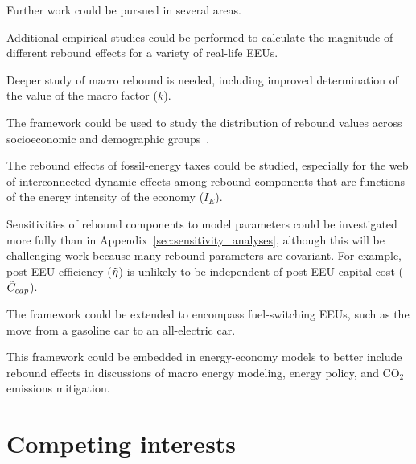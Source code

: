 \documentclass[12pt]{article}\usepackage[]{graphicx}\usepackage[]{xcolor}
\begin{document}
Further work could be pursued in several areas.
%
\begin{enumerate*}[label={(\roman*)}]

  \item Additional empirical studies could be performed
        to calculate the magnitude of different
        rebound effects for a variety of real-life EEUs.

  \item Deeper study of macro rebound is needed,
        including improved determination
        of the value of the macro factor ($k$).

  \item The framework could be used to study the
        distribution of rebound values
        across socioeconomic and demographic groups~\citep{Carroll2017}.

  \item The rebound effects of fossil-energy taxes
        could be studied,
        especially for the web of interconnected dynamic effects
        among rebound components that are functions
        of the energy intensity of the economy ($I_E$).

  \item Sensitivities of rebound components to model parameters
        could be investigated more fully
        than in Appendix~\ref{sec:sensitivity_analyses},
        although this will be challenging work because
        many rebound parameters are covariant.
        For example, post-EEU efficiency ($\tilde{\eta}$)
        is unlikely to be independent of
        post-EEU capital cost ($\tilde{C}_{cap}$).

  \item The framework could be extended to encompass
        fuel-switching EEUs, such as the move from
        a gasoline car to an all-electric car.

  \item This framework could be embedded
        in energy-economy models to better include rebound effects
        in discussions of macro energy modeling, energy policy, and
        CO$_2$ emissions mitigation.

\end{enumerate*}


\section*{Competing interests}
\label{sec:competing_interests}
\end{document}
